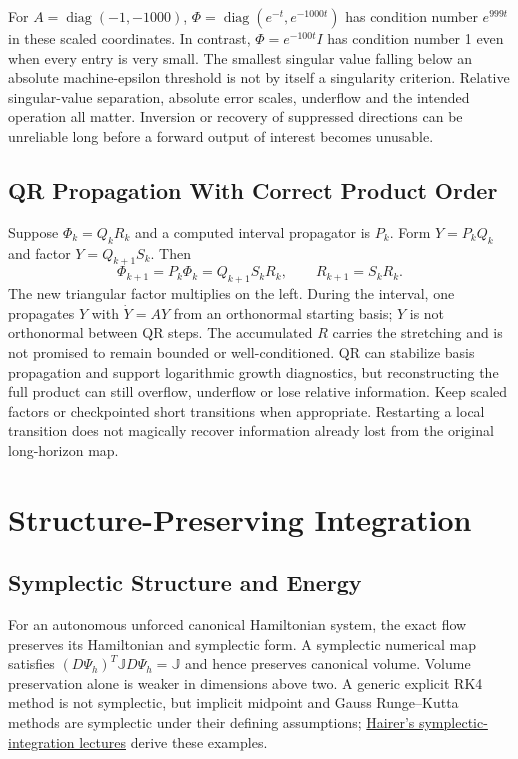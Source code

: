 For $A=\operatorname{diag}(-1,-1000)$, $\Phi=\operatorname{diag}(e^{-t},e^{-1000t})$ has condition number $e^{999t}$ in these scaled coordinates. In contrast, $\Phi=e^{-100t}I$ has condition number 1 even when every entry is very small. The smallest singular value falling below an absolute machine-epsilon threshold is not by itself a singularity criterion. Relative singular-value separation, absolute error scales, underflow and the intended operation all matter. Inversion or recovery of suppressed directions can be unreliable long before a forward output of interest becomes unusable.

\subsection{QR Propagation With Correct Product Order}

Suppose $\Phi_k=Q_kR_k$ and a computed interval propagator is $P_k$. Form $Y=P_kQ_k$ and factor $Y=Q_{k+1}S_k$. Then
\begin{equation}
\Phi_{k+1}=P_k\Phi_k=Q_{k+1}S_kR_k,
\qquad R_{k+1}=S_kR_k.
\end{equation}
The new triangular factor multiplies on the left. During the interval, one propagates $Y$ with $\dot Y=AY$ from an orthonormal starting basis; $Y$ is not orthonormal between QR steps. The accumulated $R$ carries the stretching and is not promised to remain bounded or well-conditioned. QR can stabilize basis propagation and support logarithmic growth diagnostics, but reconstructing the full product can still overflow, underflow or lose relative information. Keep scaled factors or checkpointed short transitions when appropriate. Restarting a local transition does not magically recover information already lost from the original long-horizon map.

\section{Structure-Preserving Integration}

\subsection{Symplectic Structure and Energy}

For an autonomous unforced canonical Hamiltonian system, the exact flow preserves its Hamiltonian and symplectic form. A symplectic numerical map satisfies $(D\Psi_h)^T\mathbb J D\Psi_h=\mathbb J$ and hence preserves canonical volume. Volume preservation alone is weaker in dimensions above two. A generic explicit RK4 method is not symplectic, but implicit midpoint and Gauss Runge--Kutta methods are symplectic under their defining assumptions; \href{https://www.unige.ch/~hairer/poly_geoint/week2.pdf}{Hairer's symplectic-integration lectures} derive these examples.

